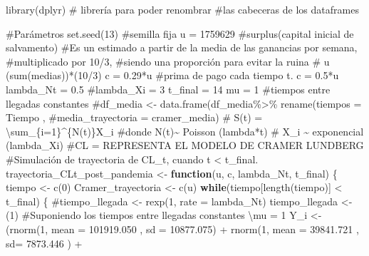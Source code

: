 \documentclass[
  us-letterpaper,
]{scrreprt}
\newenvironment{Shaded}{\begin{snugshade}}{\end{snugshade}}
\newcommand{\AttributeTok}[1]{\textcolor[rgb]{0.40,0.45,0.13}{#1}}
\newcommand{\CommentTok}[1]{\textcolor[rgb]{0.37,0.37,0.37}{#1}}
\newcommand{\ControlFlowTok}[1]{\textcolor[rgb]{0.00,0.23,0.31}{\textbf{#1}}}
\newcommand{\DecValTok}[1]{\textcolor[rgb]{0.68,0.00,0.00}{#1}}
\newcommand{\FloatTok}[1]{\textcolor[rgb]{0.68,0.00,0.00}{#1}}
\newcommand{\FunctionTok}[1]{\textcolor[rgb]{0.28,0.35,0.67}{#1}}
\newcommand{\NormalTok}[1]{\textcolor[rgb]{0.00,0.23,0.31}{#1}}
\newcommand{\OtherTok}[1]{\textcolor[rgb]{0.00,0.23,0.31}{#1}}
\newcommand{\SpecialCharTok}[1]{\textcolor[rgb]{0.37,0.37,0.37}{#1}}
\theoremstyle{plain}
\theoremstyle{plain}
\theoremstyle{definition}
\theoremstyle{remark}
\begin{document}
\begin{Shaded}
\begin{Highlighting}[]
\FunctionTok{library}\NormalTok{(dplyr) }\CommentTok{\# librería para poder renombrar }
\CommentTok{\#las cabeceras de los dataframes}

\CommentTok{\#Parámetros}
\FunctionTok{set.seed}\NormalTok{(}\DecValTok{13}\NormalTok{) }\CommentTok{\#semilla fija}
\NormalTok{u }\OtherTok{=} \DecValTok{1759629} \CommentTok{\#surplus(capital inicial de salvamento)}
\CommentTok{\#Es un estimado a partir de la media de las ganancias por semana, }
\CommentTok{\#multiplicado por 10/3, }
\CommentTok{\#siendo una proporción para evitar la ruina}
\CommentTok{\# u (sum(medias))*(10/3)}
\NormalTok{c }\OtherTok{=} \FloatTok{0.29}\SpecialCharTok{*}\NormalTok{u }\CommentTok{\#prima de pago cada tiempo t. c = 0.5*u}
\NormalTok{lambda\_Nt }\OtherTok{=} \FloatTok{0.5}
\CommentTok{\#lambda\_Xi = 3}
\NormalTok{t\_final }\OtherTok{=} \DecValTok{14}
\NormalTok{mu }\OtherTok{=} \DecValTok{1} \CommentTok{\#tiempos entre llegadas constantes}
\CommentTok{\#df\_media \textless{}{-} data.frame(df\_media\%\textgreater{}\% rename(tiempos = Tiempo , }
\CommentTok{\#media\_trayectoria = cramer\_media)}
\CommentTok{\# S(t) = \textbackslash{}sum\_\{i=1\}\^{}\{N(t)\}X\_i}
\CommentTok{\#donde N(t)\textasciitilde{} Poisson (lambda*t)}
\CommentTok{\# X\_i \textasciitilde{} exponencial (lambda\_Xi)}
\CommentTok{\#CL = REPRESENTA EL MODELO DE CRAMER LUNDBERG}
\CommentTok{\#Simulación de trayectoria de CL\_t, cuando t \textless{} t\_final.}
\NormalTok{trayectoria\_CLt\_post\_pandemia }\OtherTok{\textless{}{-}} \ControlFlowTok{function}\NormalTok{(u, c, lambda\_Nt, t\_final)}
\NormalTok{\{}
\NormalTok{  tiempo }\OtherTok{\textless{}{-}} \FunctionTok{c}\NormalTok{(}\DecValTok{0}\NormalTok{)}
\NormalTok{  Cramer\_trayectoria }\OtherTok{\textless{}{-}} \FunctionTok{c}\NormalTok{(u)}
  \ControlFlowTok{while}\NormalTok{(tiempo[}\FunctionTok{length}\NormalTok{(tiempo)] }\SpecialCharTok{\textless{}}\NormalTok{ t\_final)}
\NormalTok{  \{}
    \CommentTok{\#tiempo\_llegada \textless{}{-} rexp(1, rate = lambda\_Nt)}
\NormalTok{    tiempo\_llegada }\OtherTok{\textless{}{-}}\NormalTok{ (}\DecValTok{1}\NormalTok{) }
\CommentTok{\#Suponiendo los tiempos entre llegadas constantes \textbackslash{}mu = 1}
\NormalTok{    Y\_i }\OtherTok{\textless{}{-}}\NormalTok{  (}\FunctionTok{rnorm}\NormalTok{(}\DecValTok{1}\NormalTok{, }\AttributeTok{mean =} \FloatTok{101919.050}\NormalTok{ , }\AttributeTok{sd =} \FloatTok{10877.075}\NormalTok{)  }\SpecialCharTok{+}
               \FunctionTok{rnorm}\NormalTok{(}\DecValTok{1}\NormalTok{, }\AttributeTok{mean =}  \FloatTok{39841.721}\NormalTok{ , }\AttributeTok{sd=} \FloatTok{7873.446}\NormalTok{ ) }\SpecialCharTok{+} 

\end{Highlighting}
\end{Shaded}
\end{document}
